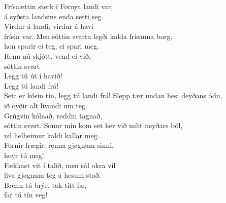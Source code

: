 \begin{flushleft}
Frísaættin sterk í Føroya landi var,\\
á syðsta landsins enda setti seg.\\
Virdur á landi, virdur á havi\\
frísin var.
\hops
Men sóttin svarta legði kalda frísanna borg,\\
hon sparir ei teg, ei spari meg.\\
Renn nú skjótt, vend ei við,\\
sóttin svørt
\hops
\hspace{0.9cm}\\
\hspace{0.9cm}Legg tú út í havið!\\
\hspace{0.9cm}Legg tú landi frá!\\
\hspace{0.9cm}Sett er kósin tín, legg tú landi frá!
\hops
Slepp tær undan hesi deyðans ódn,\\
ið oyðir alt livandi um teg.\\
Grúgvin kólnað, røddin tagnað,\\
sóttin svørt.
\hops
Sonur mín kom set her við mítt neyðars ból,\\
nú helheimur kaldi kallar meg.\\
Fornir frægir, renna gjøgnum sinni,\\
hoyr tú meg!
\hops
\hspace{0.9cm}\\
\hops
Fækkast vit í talið, men sál okra vil\\
liva gjøgnum teg á hesum stað.\\
Brenn tú brýr, tak titt fæ,\\
far tú tín veg!
\end{flushleft}

\newpage

